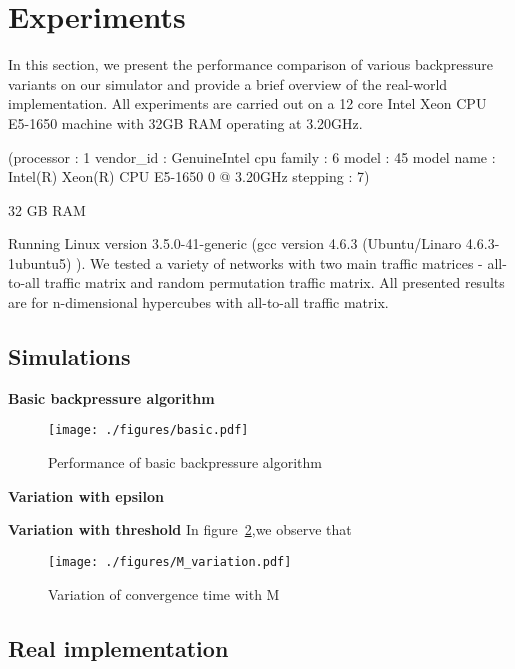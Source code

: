 \label{experiments}
\section{Experiments}

In this section, we present the performance comparison of various backpressure variants on our simulator and provide a brief overview of the real-world implementation. All experiments are carried out on a 12 core Intel Xeon CPU E5-1650 machine with 32GB RAM operating at 3.20GHz.

(processor    : 1
vendor_id    : GenuineIntel
cpu family    : 6
model        : 45
model name    : Intel(R) Xeon(R) CPU E5-1650 0 @ 3.20GHz
stepping    : 7)


32 GB RAM

Running  Linux version 3.5.0-41-generic
(gcc version 4.6.3 (Ubuntu/Linaro 4.6.3-1ubuntu5) ). We tested a variety of networks with two main traffic matrices - all-to-all traffic matrix and random permutation traffic matrix. All presented results are for n-dimensional hypercubes with all-to-all traffic matrix.

\subsection{Simulations}

\textbf{Basic backpressure algorithm}
\begin{figure}
\texttt{[image: ./figures/basic.pdf]}
\caption{\small Performance of basic backpressure algorithm}
\label{fig:M_1}
\end{figure}

\textbf{Variation with epsilon}

\textbf{Variation with threshold}
In figure~\ref{fig:M_1},we observe that 
\begin{figure}
\texttt{[image: ./figures/M\_variation.pdf]}
\caption{\small Variation of convergence time with M}
\label{fig:M_1}
\end{figure}


\subsection{Real implementation}

